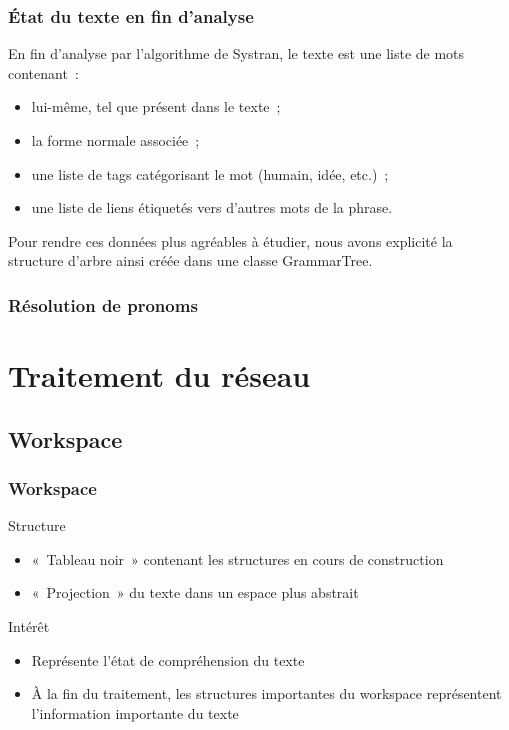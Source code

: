 \documentclass[12pt, handout]{beamer}
\begin{document}
\begin{frame}
 \frametitle{État du texte en fin d'analyse}
 En fin d'analyse par l'algorithme de Systran, le texte est une liste de mots contenant~:
 \begin{itemize}
  \item lui-même, tel que présent dans le texte~;
  \item la forme normale associée~;
  \item une liste de tags catégorisant le mot (humain, idée, etc.)~;
  \item une liste de liens étiquetés vers d'autres mots de la phrase.
 \end{itemize}
 
 Pour rendre ces données plus agréables à étudier, nous avons explicité la structure d'arbre ainsi créée dans une classe GrammarTree.
 
\end{frame}


\begin{frame}%
 \frametitle{Résolution de pronoms}
 
 
\end{frame}


\section{Traitement du réseau}

\subsection{Workspace}

\begin{frame}
  \frametitle{Workspace}

  \begin{block}{Structure}
    \begin{itemize}
      \item «~Tableau noir~» contenant les structures en cours de construction
      \item «~Projection~» du texte dans un espace plus abstrait
    \end{itemize}
  \end{block}
  \begin{block}{Intérêt}
    \begin{itemize}
      \item Représente l'état de compréhension du texte
      \item À la fin du traitement, les structures importantes du workspace représentent l'information importante du texte
    \end{itemize}
  \end{block}

\end{frame}
\end{document}
